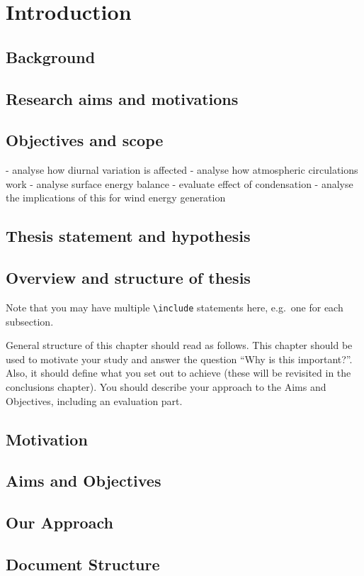 \chapter{Introduction}
\label{ch:intro}

\section{Background}

\section{Research aims and motivations}

\section{Objectives and scope}

- analyse how diurnal variation is affected
- analyse how atmospheric circulations work
- analyse surface energy balance
- evaluate effect of condensation
- analyse the implications of this for wind energy generation

\section{Thesis statement and hypothesis}

\section{Overview and structure of thesis}

Note that you may have multiple \texttt{{\textbackslash}include} statements here, e.g.\ one for each subsection.

General structure of this chapter should read as follows.  This chapter should be used to motivate your study and answer the question ``Why is this important?''. Also, it should define what you set out to achieve (these will be revisited in the conclusions chapter). You should describe your approach to the Aims and Objectives, including an evaluation part.

\section*{Motivation} %
\blindtext

\section*{Aims and Objectives} 
\blindtext

\section*{Our Approach} 
\blindtext

\section*{Document Structure}
\blindtext
